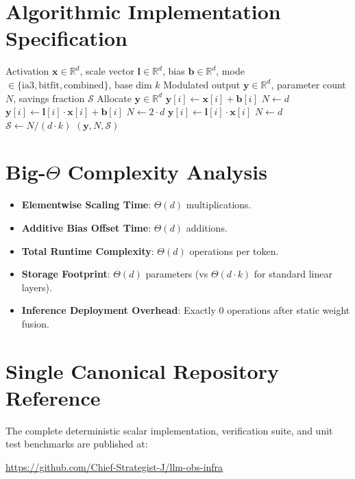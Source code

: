 \documentclass[11pt,a4paper]{article}
\theoremstyle{definition}
\begin{document}
\section{Algorithmic Implementation Specification}

\begin{algorithm}[H]
\caption{IA³ and BitFit Minimal Tuning Forward Map}
\begin{algorithmic}[1]
\Require Activation $\mathbf{x} \in \mathbb{R}^d$, scale vector $\mathbf{l} \in \mathbb{R}^d$, bias $\mathbf{b} \in \mathbb{R}^d$, mode $\in \{\text{ia3}, \text{bitfit}, \text{combined}\}$, base dim $k$
\Ensure Modulated output $\mathbf{y} \in \mathbb{R}^d$, parameter count $N$, savings fraction $\mathcal{S}$
\State Allocate $\mathbf{y} \in \mathbb{R}^d$
        \State $\mathbf{y}[i] \gets \mathbf{x}[i] + \mathbf{b}[i]$
    \EndFor
    \State $N \gets d$
        \State $\mathbf{y}[i] \gets \mathbf{l}[i] \cdot \mathbf{x}[i] + \mathbf{b}[i]$
    \EndFor
    \State $N \gets 2 \cdot d$
\Else
        \State $\mathbf{y}[i] \gets \mathbf{l}[i] \cdot \mathbf{x}[i]$
    \EndFor
    \State $N \gets d$
\EndIf
\State $\mathcal{S} \gets N / (d \cdot k)$
\State \Return $(\mathbf{y}, N, \mathcal{S})$
\end{algorithmic}
\end{algorithm}

\section{Big-$\Theta$ Complexity Analysis}

\begin{itemize}
    \item \textbf{Elementwise Scaling Time}: $\Theta(d)$ multiplications.
    \item \textbf{Additive Bias Offset Time}: $\Theta(d)$ additions.
    \item \textbf{Total Runtime Complexity}: $\Theta(d)$ operations per token.
    \item \textbf{Storage Footprint}: $\Theta(d)$ parameters (vs $\Theta(d \cdot k)$ for standard linear layers).
    \item \textbf{Inference Deployment Overhead}: Exactly $0$ operations after static weight fusion.
\end{itemize}

\section{Single Canonical Repository Reference}

The complete deterministic scalar implementation, verification suite, and unit test benchmarks are published at:
\begin{center}
\url{https://github.com/Chief-Strategist-J/llm-obs-infra}
\end{center}
\end{document}

